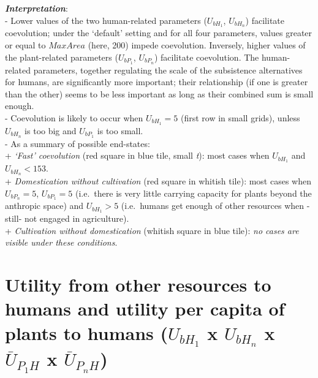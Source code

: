 \documentclass[
]{book}
\begin{document}
\textbf{\emph{Interpretation}}:\\
- Lower values of the two human-related parameters (\(U_{bH_{1}}\), \(U_{bH_{n}}\)) facilitate coevolution; under the `default' setting and for all four parameters, values greater or equal to \(MaxArea\) (here, 200) impede coevolution. Inversely, higher values of the plant-related parameters (\(U_{bP_{1}}\), \(U_{bP_{n}}\)) facilitate coevolution. The human-related parameters, together regulating the scale of the subsistence alternatives for humans, are significantly more important; their relationship (if one is greater than the other) seems to be less important as long as their combined sum is small enough.\\
- Coevolution is likely to occur when \(U_{bH_{1}}=5\) (first row in small grids), unless \(U_{bH_{n}}\) is too big and \(U_{bP_{1}}\) is too small.\\
- As a summary of possible end-states:\\
+ \emph{`Fast' coevolution} (red square in blue tile, small \emph{t}): most cases when \(U_{bH_{1}}\) and \(U_{bH_{n}}<153\).\\
+ \emph{Domestication without cultivation} (red square in whitish tile): most cases when \(U_{bP_{n}}=5\), \(U_{bP_{1}}=5\) (i.e.~there is very little carrying capacity for plants beyond the anthropic space) and \(U_{bH_{1}}>5\) (i.e.~humans get enough of other resources when -still- not engaged in agriculture).\\
+ \emph{Cultivation without domestication} (whitish square in blue tile): \emph{no cases are visible under these conditions}.

\newpage

\hypertarget{utility-from-other-resources-to-humans-and-utility-per-capita-of-plants-to-humans-u_bh_1-x-u_bh_n-x-baru_p_1h-x-baru_p_nh}{%
\section{\texorpdfstring{Utility from other resources to humans and utility per capita of plants to humans (\(U_{bH_{1}}\) x \(U_{bH_{n}}\) x \(\bar{U}_{P_{1}H}\) x \(\bar{U}_{P_{n}H}\))}{Utility from other resources to humans and utility per capita of plants to humans (U\_\{bH\_\{1\}\} x U\_\{bH\_\{n\}\} x \textbackslash bar\{U\}\_\{P\_\{1\}H\} x \textbackslash bar\{U\}\_\{P\_\{n\}H\})}}\label{utility-from-other-resources-to-humans-and-utility-per-capita-of-plants-to-humans-u_bh_1-x-u_bh_n-x-baru_p_1h-x-baru_p_nh}}
\end{document}
